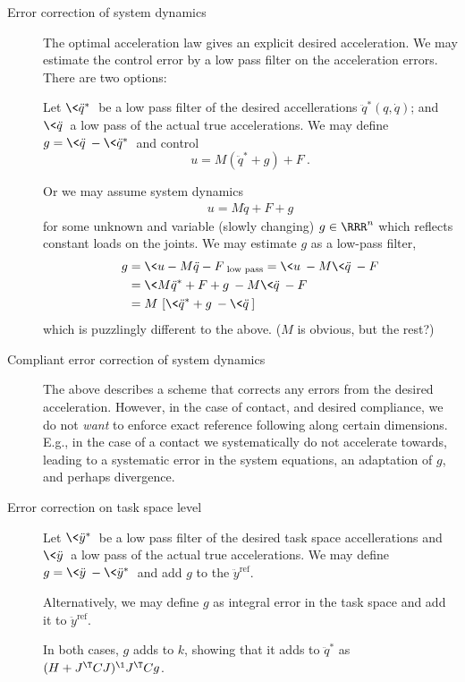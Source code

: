 \documentclass[10pt,fleqn,twoside]{article}
\newcommand{\rf}{{\text{ref}}}
\begin{document}
{{\begin{description}
\item[Error correction of system dynamics]

The optimal acceleration law gives an explicit desired
acceleration. We may estimate the control error by a low pass filter
on the acceleration errors. There are two options:

Let $\<\ddot q^*\>$ be a low pass filter of the desired accellerations
$\ddot q^*(q,\dot q)$; and $\<\ddot q\>$ a low pass of the actual true
accelerations. We may define $g = \<\ddot q\> - \<\ddot q^*\>$ and
control
$$u=M (\ddot q^* + g) + F ~.$$

Or we may assume system dynamics
\begin{align}
u=M \ddot q + F + g
\end{align}
for some unknown and variable (slowly changing) $g\in\RRR^n$ which
reflects constant loads on the joints. We may estimate $g$ as a
low-pass filter,
\begin{align}
g
&= \< u - M \ddot q - F \>_\text{low pass}
 = \< u \> - M \<\ddot q\> - F \\
&= \<M \ddot q^* + F + g\> - M \<\ddot q\> - F \\
&= M~ [ \< \ddot q^* + g\> - \<\ddot q\>]
\end{align}
which is puzzlingly different to the above. ($M$ is obvious, but the rest?)

\item[Compliant error correction of system dynamics]

The above describes a scheme that corrects any errors from the desired
acceleration. However, in the case of contact, and desired compliance,
we do not \emph{want} to enforce exact reference following along
certain dimensions. E.g., in the case of a contact we systematically
do not accelerate towards, leading to a systematic error in the system
equations, an adaptation of $g$, and perhaps divergence.

\item[Error correction on task space level]

Let $\<\ddot y^*\>$ be a low pass filter of the desired task space
accellerations and $\<\ddot y\>$ a low pass of the actual true
accelerations. We may define $g=\<\ddot y\> - \<\ddot y^*\>$ and add
$g$ to the $\ddot y^\rf$.

Alternatively, we may define $g$ as integral error in the task space
and add it to $\ddot y^\rf$.

In both cases, $g$ adds to $k$, showing that it adds to $\ddot q^*$
as $(H + J^\T C J)^\1 J^\T C g$.


\end{description}}}
\end{document}
